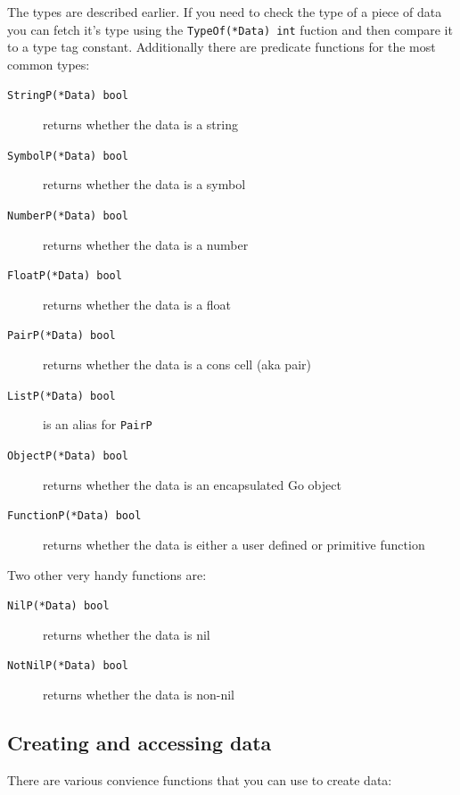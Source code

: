 \documentclass[12pt]{article}
\begin{document}
\noindent The types are described earlier. If you need to check the
type of a piece of data you can fetch it's type using the
\verb|TypeOf(*Data) int| fuction and then compare it to a type tag
constant. Additionally there are predicate functions for the most
common types:

\begin{description}
\item [{\tt StringP(*Data) bool}] returns whether the data is a string
\item [{\tt SymbolP(*Data) bool}] returns whether the data is a symbol
\item [{\tt NumberP(*Data) bool}] returns whether the data is a number
\item [{\tt FloatP(*Data) bool}] returns whether the data is a float
\item [{\tt PairP(*Data) bool}] returns whether the data is a cons cell
  (aka pair)
\item [{\tt ListP(*Data) bool}] is an alias for \verb|PairP|
\item [{\tt ObjectP(*Data) bool}] returns whether the data is an
  encapsulated Go object
\item [{\tt FunctionP(*Data) bool}] returns whether the data is either
  a user defined or primitive function
\end{description}

\noindent Two other very handy functions are:

\begin{description}
\item [{\tt NilP(*Data) bool}] returns whether the data is nil
\item [{\tt NotNilP(*Data) bool}] returns whether the data is non-nil
\end{description}

\subsection{Creating and accessing data}

There are various convience functions that you can use to create data:
\end{document}
